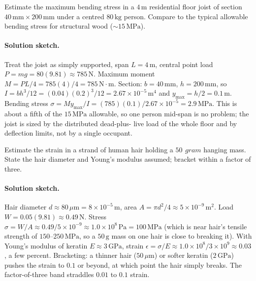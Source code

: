 \begin{exercise}
Estimate the maximum bending stress in a $4\,\si{\meter}$ residential
floor joist of section $40\,\si{\milli\meter} \times 200\,\si{\milli
\meter}$ under a centred $80\,\si{\kilogram}$ person. Compare to the
typical allowable bending stress for structural wood ($\sim
15\,\text{MPa}$).
\paragraph{Solution sketch.} Treat the joist as simply supported, span
$L = 4\,\si{\meter}$, central point load $P = mg = 80(9.81) \approx
785\,\text{N}$. Maximum moment $M = PL/4 = 785(4)/4 = 785\,\text{N}
\cdot\text{m}$. Section: $b = 40\,\si{\milli\meter}$, $h = 200\,\si{
\milli\meter}$, so $I = bh^3/12 = (0.04)(0.2)^3/12 = 2.67\times 10^{-5}
\,\si{\meter}^4$ and $y_{\max} = h/2 = 0.1\,\si{\meter}$. Bending stress
$\sigma = My_{\max}/I = (785)(0.1)/2.67\times 10^{-5} = 2.9\,\text{MPa}$.
This is about a fifth of the $15\,\text{MPa}$ allowable, so one person
mid-span is no problem; the joist is sized by the distributed dead-plus-
live load of the whole floor and by deflection limits, not by a single
occupant.
\end{exercise}

\begin{exercise}
Estimate the strain in a strand of human hair holding a $50\,\si{\
gram}$ hanging mass. State the hair diameter and Young's modulus
assumed; bracket within a factor of three.
\paragraph{Solution sketch.} Hair diameter $d \approx 80\,\mu\text{m} =
8\times 10^{-5}\,\si{\meter}$, area $A = \pi d^2/4 \approx 5\times
10^{-9}\,\si{\meter}^2$. Load $W = 0.05(9.81) \approx 0.49\,\text{N}$.
Stress $\sigma = W/A \approx 0.49/5\times 10^{-9} \approx 1.0\times
10^8\,\text{Pa} = 100\,\text{MPa}$ (which is near hair's tensile
strength of $150$--$250\,\text{MPa}$, so a $50\,\si{\gram}$ mass on one
hair is close to breaking it). With Young's modulus of keratin $E
\approx 3\,\text{GPa}$, strain $\epsilon = \sigma/E \approx 1.0\times
10^8 / 3\times 10^9 \approx 0.03$, a few percent. Bracketing: a thinner
hair ($50\,\mu\text{m}$) or softer keratin ($2\,\text{GPa}$) pushes the
strain to $0.1$ or beyond, at which point the hair simply breaks. The
factor-of-three band straddles $0.01$ to $0.1$ strain.
\end{exercise}

